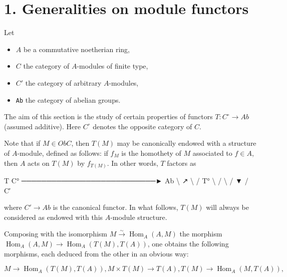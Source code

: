 \documentclass[
  11pt,
  a4paper,
]{book}
\newenvironment{Shaded}{}{}
\newcommand{\NormalTok}[1]{#1}
\providecommand{\tightlist}{%
  \setlength{\itemsep}{0pt}\setlength{\parskip}{0pt}}
\begin{document}
\section{1. Generalities on module
functors}\label{generalities-on-module-functors}

Let

\begin{itemize}
\tightlist
\item
  \(A\) be a commutative noetherian ring,
\item
  \(C\) the category of \(A\)-modules of finite type,
\item
  \(C'\) the category of arbitrary \(A\)-modules,
\item
  \texttt{Ab} the category of abelian groups.
\end{itemize}

The aim of this section is the study of certain properties of functors
\(T : C^{\circ} \to Ab\) (assumed additive). Here \(C^{\circ}\) denotes
the opposite category of \(C\).

Note that if \(M \in Ob C\), then \(T(M)\) may be canonically endowed
with a structure of \(A\)-module, defined as follows: if \(f_{M}\) is
the homothety of \(M\) associated to \(f \in A\), then \(A\) acts on
\(T(M)\) by \(f_{T(M)}\). In other words, \(T\) factors as

\begin{Shaded}
\begin{Highlighting}[]
\NormalTok{                         T}
\NormalTok{        C°  ───────────────────────────►  Ab}
\NormalTok{           \textbackslash{}                            ↗}
\NormalTok{            \textbackslash{}                        /}
\NormalTok{         T°  \textbackslash{}                  /}
\NormalTok{              \textbackslash{}              /}
\NormalTok{               ▼          /}
\NormalTok{                  C′}
\end{Highlighting}
\end{Shaded}

where \(C' \to Ab\) is the canonical functor. In what follows, \(T(M)\)
will always be considered as endowed with this \(A\)-module structure.

Composing with the isomorphism
\(M \xrightarrow{\sim} \operatorname{Hom}_{A}(A, M)\) the morphism
\(\operatorname{Hom}_{A}(A, M) \to \operatorname{Hom}_{A}(T(M), T(A))\),
one obtains the following morphisms, each deduced from the other in an
obvious way:

\[ M \longrightarrow \operatorname{Hom}_{A}(T(M), T(A)), M \times T(M) \longrightarrow T(A), T(M) \longrightarrow
\operatorname{Hom}_{A}(M, T(A)), \]
\end{document}
